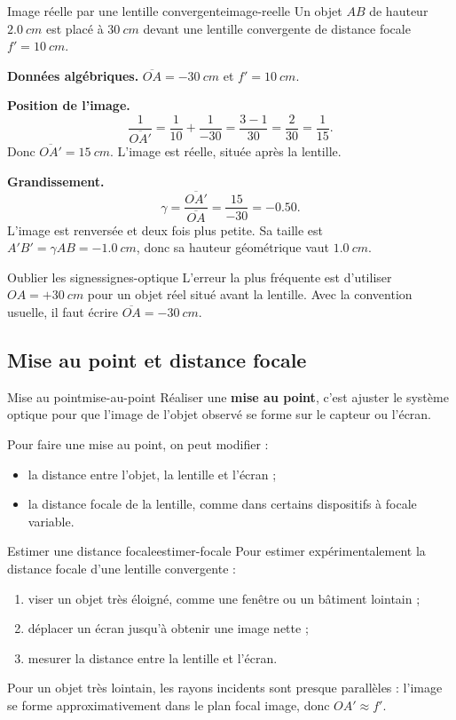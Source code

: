 \documentclass[11pt,a4paper]{article}
\begin{document}
\begin{examplebox}{Image réelle par une lentille convergente}{image-reelle}
Un objet $AB$ de hauteur $\SI{2.0}{cm}$ est placé à $\SI{30}{cm}$ devant une lentille convergente de distance focale $f'=\SI{10}{cm}$.

\textbf{Données algébriques.} $\overline{OA}=\SI{-30}{cm}$ et $f'=\SI{10}{cm}$.

\textbf{Position de l'image.}
\[
\frac{1}{\overline{OA'}}=\frac{1}{10}+\frac{1}{-30}=\frac{3-1}{30}=\frac{2}{30}=\frac{1}{15}.
\]
Donc $\overline{OA'}=\SI{15}{cm}$. L'image est réelle, située après la lentille.

\textbf{Grandissement.}
\[
\gamma=\frac{\overline{OA'}}{\overline{OA}}=\frac{15}{-30}=-0.50.
\]
L'image est renversée et deux fois plus petite. Sa taille est $A'B'=\gamma AB=-\SI{1.0}{cm}$, donc sa hauteur géométrique vaut $\SI{1.0}{cm}$.
\end{examplebox}

\begin{warningbox}{Oublier les signes}{signes-optique}
L'erreur la plus fréquente est d'utiliser $OA=+\SI{30}{cm}$ pour un objet réel situé avant la lentille. Avec la convention usuelle, il faut écrire $\overline{OA}=-\SI{30}{cm}$.
\end{warningbox}

\subsection{Mise au point et distance focale}

\begin{definitionbox}{Mise au point}{mise-au-point}
Réaliser une \textbf{mise au point}, c'est ajuster le système optique pour que l'image de l'objet observé se forme sur le capteur ou l'écran.
\end{definitionbox}

Pour faire une mise au point, on peut modifier :
\begin{itemize}
  \item la distance entre l'objet, la lentille et l'écran ;
  \item la distance focale de la lentille, comme dans certains dispositifs à focale variable.
\end{itemize}

\begin{methodbox}{Estimer une distance focale}{estimer-focale}
Pour estimer expérimentalement la distance focale d'une lentille convergente :
\begin{enumerate}[label=\arabic*)]
  \item viser un objet très éloigné, comme une fenêtre ou un bâtiment lointain ;
  \item déplacer un écran jusqu'à obtenir une image nette ;
  \item mesurer la distance entre la lentille et l'écran.
\end{enumerate}
Pour un objet très lointain, les rayons incidents sont presque parallèles : l'image se forme approximativement dans le plan focal image, donc $OA'\approx f'$.
\end{methodbox}
\end{document}
